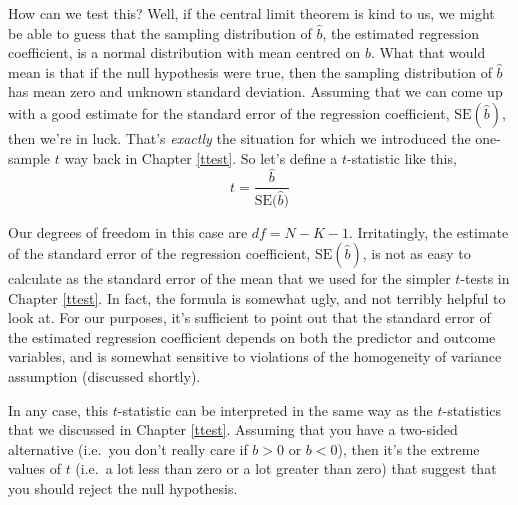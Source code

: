 \documentclass[
  11pt,
  a4paper,
  twoside,symmetric,openright]{book}
\theoremstyle{break}
\theoremstyle{break}
\begin{document}
How can we test this? Well, if the central limit theorem is kind to us, we might be able to guess that the sampling distribution of \(\hat{b}\), the estimated regression coefficient, is a normal distribution with mean centred on \(b\). What that would mean is that if the null hypothesis were true, then the sampling distribution of \(\hat{b}\) has mean zero and unknown standard deviation. Assuming that we can come up with a good estimate for the standard error of the regression coefficient, \(\mbox{SE}({\hat{b}})\), then we're in luck. That's \emph{exactly} the situation for which we introduced the one-sample \(t\) way back in Chapter \ref{ttest}. So let's define a \(t\)-statistic like this,
\[
t = \frac{\hat{b}}{\mbox{SE}({\hat{b})}}
\]

Our degrees of freedom in this case are \(df = N- K- 1\). Irritatingly, the estimate of the standard error of the regression coefficient, \(\mbox{SE}({\hat{b}})\), is not as easy to calculate as the standard error of the mean that we used for the simpler \(t\)-tests in Chapter \ref{ttest}. In fact, the formula is somewhat ugly, and not terribly helpful to look at. For our purposes, it's sufficient to point out that the standard error of the estimated regression coefficient depends on both the predictor and outcome variables, and is somewhat sensitive to violations of the homogeneity of variance assumption (discussed shortly).

In any case, this \(t\)-statistic can be interpreted in the same way as the \(t\)-statistics that we discussed in Chapter \ref{ttest}. Assuming that you have a two-sided alternative (i.e.~you don't really care if \(b >0\) or \(b < 0\)), then it's the extreme values of \(t\) (i.e.~a lot less than zero or a lot greater than zero) that suggest that you should reject the null hypothesis.
\end{document}
